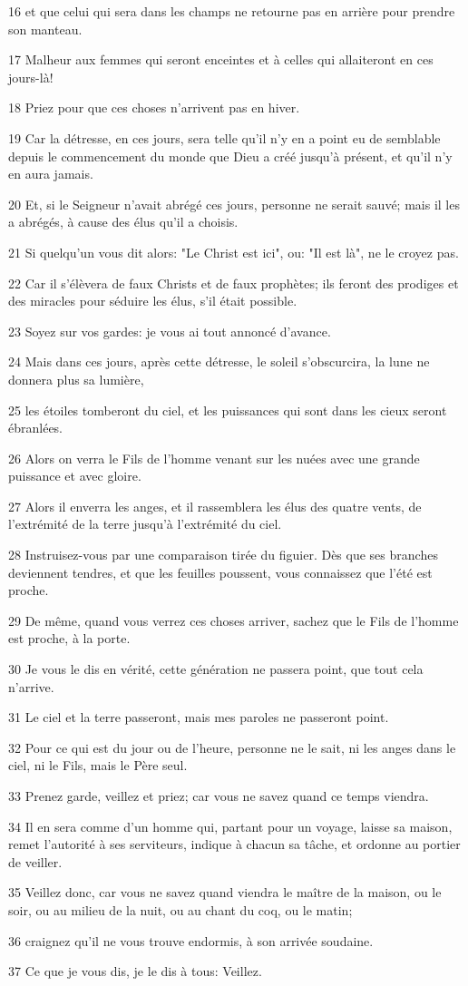 \par 16 et que celui qui sera dans les champs ne retourne pas en arrière pour prendre son manteau.
\par 17 Malheur aux femmes qui seront enceintes et à celles qui allaiteront en ces jours-là!
\par 18 Priez pour que ces choses n'arrivent pas en hiver.
\par 19 Car la détresse, en ces jours, sera telle qu'il n'y en a point eu de semblable depuis le commencement du monde que Dieu a créé jusqu'à présent, et qu'il n'y en aura jamais.
\par 20 Et, si le Seigneur n'avait abrégé ces jours, personne ne serait sauvé; mais il les a abrégés, à cause des élus qu'il a choisis.
\par 21 Si quelqu'un vous dit alors: "Le Christ est ici", ou: "Il est là", ne le croyez pas.
\par 22 Car il s'élèvera de faux Christs et de faux prophètes; ils feront des prodiges et des miracles pour séduire les élus, s'il était possible.
\par 23 Soyez sur vos gardes: je vous ai tout annoncé d'avance.
\par 24 Mais dans ces jours, après cette détresse, le soleil s'obscurcira, la lune ne donnera plus sa lumière,
\par 25 les étoiles tomberont du ciel, et les puissances qui sont dans les cieux seront ébranlées.
\par 26 Alors on verra le Fils de l'homme venant sur les nuées avec une grande puissance et avec gloire.
\par 27 Alors il enverra les anges, et il rassemblera les élus des quatre vents, de l'extrémité de la terre jusqu'à l'extrémité du ciel.
\par 28 Instruisez-vous par une comparaison tirée du figuier. Dès que ses branches deviennent tendres, et que les feuilles poussent, vous connaissez que l'été est proche.
\par 29 De même, quand vous verrez ces choses arriver, sachez que le Fils de l'homme est proche, à la porte.
\par 30 Je vous le dis en vérité, cette génération ne passera point, que tout cela n'arrive.
\par 31 Le ciel et la terre passeront, mais mes paroles ne passeront point.
\par 32 Pour ce qui est du jour ou de l'heure, personne ne le sait, ni les anges dans le ciel, ni le Fils, mais le Père seul.
\par 33 Prenez garde, veillez et priez; car vous ne savez quand ce temps viendra.
\par 34 Il en sera comme d'un homme qui, partant pour un voyage, laisse sa maison, remet l'autorité à ses serviteurs, indique à chacun sa tâche, et ordonne au portier de veiller.
\par 35 Veillez donc, car vous ne savez quand viendra le maître de la maison, ou le soir, ou au milieu de la nuit, ou au chant du coq, ou le matin;
\par 36 craignez qu'il ne vous trouve endormis, à son arrivée soudaine.
\par 37 Ce que je vous dis, je le dis à tous: Veillez.

